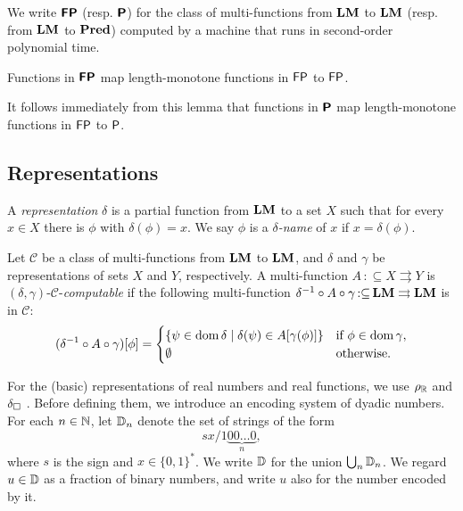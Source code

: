 \documentclass[envcountsame,orivec,oribibl]{llncs}
\newcommand{\pcolon}{\mathpunct{\,:\subseteq}}
\begin{document}
\begin{definition}
 We write $\text{\bfseries \sffamily \upshape FP}$ (resp. $\text{\bfseries \sffamily \upshape P}$) for the class of
 multi-functions from $\mathbf{LM}$ to $\mathbf{LM}$ (resp. from $\mathbf{LM}$ to $\mathbf{Pred}$) 
 computed by a machine that runs
 in second-order polynomial time.
\end{definition}

\begin{lemma}
 Functions in $\text{\bfseries \sffamily \upshape FP}$ map 
 length-monotone functions in $\mathsf{FP}$ to $\mathsf{FP}$.
\end{lemma}

It follows immediately from this lemma that functions in $\text{\bfseries \sffamily \upshape P}$ map 
 length-monotone functions in $\mathsf{FP}$ to $\mathsf{P}$.


\subsection{Representations}

A {\em representation} $\delta$ is a partial function from $\mathbf{LM}$ to a set $X$
such that for every $x \in X$ there is $\phi$ with $\delta (\phi) = x$.
We say $\phi$ is a {\em $\delta$-name} of $x$
if $x = \delta(\phi)$.

Let $\mathcal C$ be a class of multi-functions from $\mathbf{LM}$ to $\mathbf{LM}$,
and $\delta$ and $\gamma$ be representations of sets $X$ and $Y$, respectively.
A multi-function $A \pcolon X \rightrightarrows Y$
is $(\delta, \gamma)$-$\mathcal C$-\emph{computable} if 
the following multi-function $\delta^{-1} \circ A \circ \gamma \pcolon \LM \rightrightarrows \LM$ is in $\mathcal C$: 
\begin{equation}
 (\delta^{-1} \circ A \circ \gamma)[\phi] = 
  \begin{cases}
   \{\psi \in \mathop{\rm dom} \delta \mid \delta(\psi) \in A[\gamma(\phi)] \}
   & 
   \text{if } \phi \in \mathop{\rm dom} \gamma, 
   \\ 
   \emptyset 
   &
   \text{otherwise.}
  \end{cases}
\end{equation}


For the (basic) representations of real numbers and real functions,
we use $\rho _\mathbb R$ and $\delta _\square$ \cite{kawamura2012complexity}.
Before defining them, we introduce an encoding system of dyadic numbers.
For each $n \in \mathbb N$, let $\mathbb D_n$ denote the set of strings of the form
\begin{equation}
 sx/1\!\underbrace{00\dots0}_{n},
\end{equation}
where $s$ is the sign and $x \in \{0,1\}^*$.
We write $\mathbb D$ for the union $\bigcup _n \mathbb D _n$.
We regard $u \in \mathbb D$ as a fraction of binary numbers, 
and write $u$ also for the number encoded by it.
\end{document}
